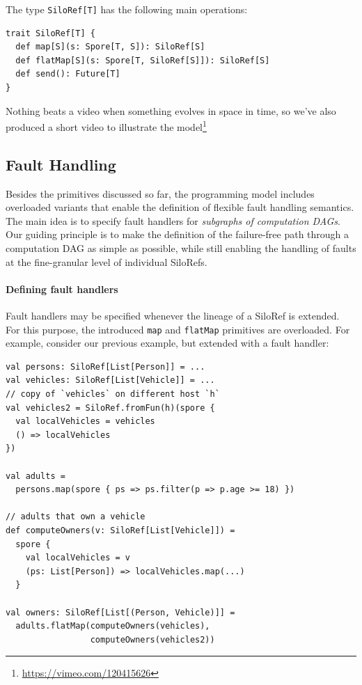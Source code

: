 \documentclass{sigplanconf}
\theoremstyle{definition}
\theoremstyle{definition}
\begin{document}
The type \verb|SiloRef[T]| has the following main operations:

\begin{lstlisting}
trait SiloRef[T] {
  def map[S](s: Spore[T, S]): SiloRef[S]
  def flatMap[S](s: Spore[T, SiloRef[S]]): SiloRef[S]
  def send(): Future[T]
}
\end{lstlisting}


Nothing beats a video when something evolves in space in time, so we've also produced a short video to illustrate the model\footnote{\url{https://vimeo.com/120415626}}


\subsection{Fault Handling}
\label{sec:fault-handling}

Besides the primitives discussed so far, the programming model includes
overloaded variants that enable the definition of flexible fault handling
semantics. The main idea is to specify fault handlers for \emph{subgraphs of
computation DAGs}. Our guiding principle is to make the definition of the
failure-free path through a computation DAG as simple as possible, while still
enabling the handling of faults at the fine-granular level of individual
SiloRefs.

\paragraph{Defining fault handlers} Fault handlers may be specified whenever
the lineage of a SiloRef is extended. For this purpose, the introduced
\verb|map| and \verb|flatMap| primitives are overloaded. For example,
consider our previous example, but extended with a fault handler:

\begin{lstlisting}
val persons: SiloRef[List[Person]] = ...
val vehicles: SiloRef[List[Vehicle]] = ...
// copy of `vehicles` on different host `h`
val vehicles2 = SiloRef.fromFun(h)(spore {
  val localVehicles = vehicles
  () => localVehicles
})

val adults =
  persons.map(spore { ps => ps.filter(p => p.age >= 18) })

// adults that own a vehicle
def computeOwners(v: SiloRef[List[Vehicle]]) =
  spore {
    val localVehicles = v
    (ps: List[Person]) => localVehicles.map(...)
  }

val owners: SiloRef[List[(Person, Vehicle)]] =
  adults.flatMap(computeOwners(vehicles),
                 computeOwners(vehicles2))
\end{lstlisting}
\end{document}
